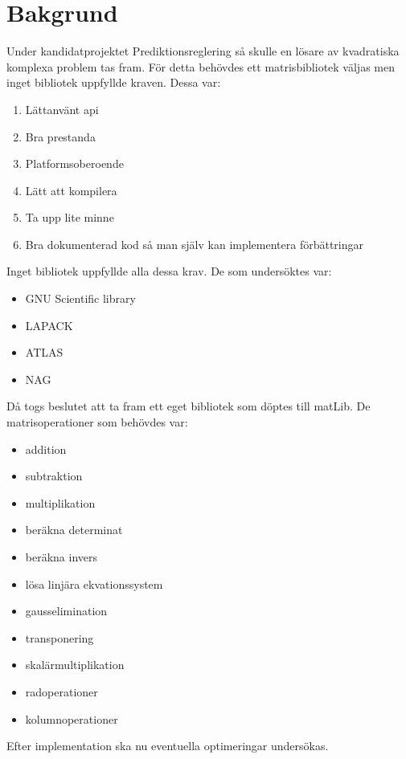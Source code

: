 \section{Bakgrund}
Under kandidatprojektet Prediktionsreglering så skulle en lösare av kvadratiska komplexa problem tas fram. För detta behövdes ett matrisbibliotek väljas men inget bibliotek uppfyllde kraven. Dessa var:
\begin{enumerate}

\item Lättanvänt api
\item Bra prestanda
\item Platformsoberoende
\item Lätt att kompilera
\item Ta upp lite minne
\item Bra dokumenterad kod så man själv kan implementera förbättringar

\end{enumerate} 

Inget bibliotek uppfyllde alla dessa krav. De som undersöktes var:
\begin{itemize}

\item GNU Scientific library
\item LAPACK
\item ATLAS
\item NAG

\end{itemize}
Då togs beslutet att ta fram ett eget bibliotek som döptes till matLib. De matrisoperationer som behövdes var:
\begin{itemize}

\item addition
\item subtraktion
\item multiplikation
\item beräkna determinat
\item beräkna invers
\item lösa linjära ekvationssystem
\item gausselimination
\item transponering
\item skalärmultiplikation
\item radoperationer
\item kolumnoperationer

\end{itemize}
Efter implementation ska nu eventuella optimeringar undersökas. 

